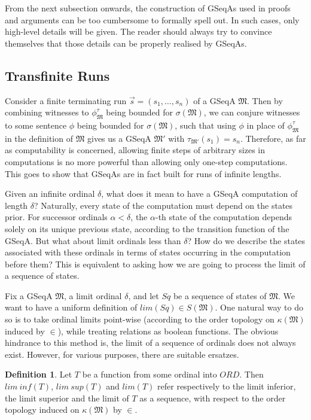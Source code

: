 \documentclass[12pt, twoside]{memoir}
\numberwithin{equation}{section}
\theoremstyle{definition}
\newtheorem{defi}[thm]{Definition}
\theoremstyle{remark}
\theoremstyle{definition}
\theoremstyle{definition}
\theoremstyle{definition}
\theoremstyle{remark}
\begin{document}
From the next subsection onwards, the construction of GSeqAs used in proofs and arguments can be too cumbersome to formally spell out. In such cases, only high-level details will be given. The reader should always try to convince themselves that those details can be properly realised by GSeqAs.

\subsection{Transfinite Runs}\label{ss270}

Consider a finite terminating run $\Vec{s} = (s_1, \dots, s_n)$ of a GSeqA $\mathfrak{M}$. Then by combining witnesses to $\phi^{\tau}_{\mathfrak{M}}$ being bounded for $\sigma(\mathfrak{M})$, we can conjure witnesses to some sentence $\phi$ being bounded for $\sigma(\mathfrak{M})$, such that using $\phi$ in place of $\phi^{\tau}_{\mathfrak{M}}$ in the definition of $\mathfrak{M}$ gives us a GSeqA $\mathfrak{M}'$ with $\tau_{\mathfrak{M}'}(s_1) = s_n$. Therefore, as far as computability is concerned, allowing finite steps of arbitrary sizes in computations is no more powerful than allowing only one-step computations. This goes to show that
GSeqAs are in fact built for runs of infinite lengths.

Given an infinite ordinal $\delta$, what does it mean to have a GSeqA computation of length $\delta$? Naturally, every state of the computation must depend on the states prior. For successor ordinals $\alpha < \delta$, the $\alpha$-th state of the computation depends solely on its unique previous state, according to the transition function of the GSeqA. But what about limit ordinals less than $\delta$? How do we describe the states associated with these ordinals in terms of states occurring in the computation before them? This is equivalent to asking how we are going to process the limit of a sequence of states.

Fix a GSeqA $\mathfrak{M}$, a limit ordinal $\delta$, and let $Sq$ be a sequence of states of $\mathfrak{M}$. We want to have a uniform definition of $lim(Sq) \in S(\mathfrak{M})$. One natural way to do so is to take ordinal limits point-wise (according to the order topology on $\kappa(\mathfrak{M})$ induced by $\in$), while treating relations as boolean functions. The obvious hindrance to this method is, the limit of a sequence of ordinals does not always exist. However, for various purposes, there are suitable ersatzes.

\begin{defi}
Let $T$ be a function from some ordinal into $ORD$. Then $lim \ inf (T)$, $lim \ sup (T)$ and $lim(T)$ refer respectively to the limit inferior, the limit superior and the limit of $T$ as a sequence, with respect to the order topology induced on $\kappa(\mathfrak{M})$ by $\in$.
\end{defi}
\end{document}
